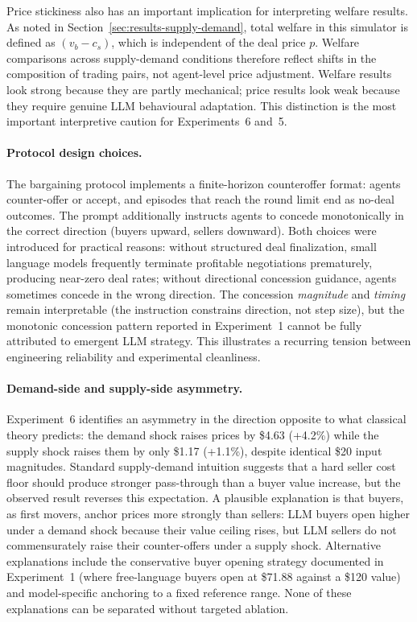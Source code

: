 Price stickiness also has an important implication for interpreting welfare results.  As noted in Section~\ref{sec:results-supply-demand}, total welfare in this simulator is defined as $(v_b - c_s)$, which is independent of the deal price $p$.  Welfare comparisons across supply-demand conditions therefore reflect shifts in the composition of trading pairs, not agent-level price adjustment.  Welfare results look strong because they are partly mechanical; price results look weak because they require genuine LLM behavioural adaptation.  This distinction is the most important interpretive caution for Experiments~6 and~5.

\paragraph{Protocol design choices.}
The bargaining protocol implements a finite-horizon counteroffer format: agents counter-offer or accept, and episodes that reach the round limit end as no-deal outcomes.  The prompt additionally instructs agents to concede monotonically in the correct direction (buyers upward, sellers downward).  Both choices were introduced for practical reasons: without structured deal finalization, small language models frequently terminate profitable negotiations prematurely, producing near-zero deal rates; without directional concession guidance, agents sometimes concede in the wrong direction.  The concession \emph{magnitude} and \emph{timing} remain interpretable (the instruction constrains direction, not step size), but the monotonic concession pattern reported in Experiment~1 cannot be fully attributed to emergent LLM strategy.  This illustrates a recurring tension between engineering reliability and experimental cleanliness.

\paragraph{Demand-side and supply-side asymmetry.}
Experiment~6 identifies an asymmetry in the direction opposite to what classical theory predicts: the demand shock raises prices by \$4.63 (+4.2\%) while the supply shock raises them by only \$1.17 (+1.1\%), despite identical \$20 input magnitudes.  Standard supply-demand intuition suggests that a hard seller cost floor should produce stronger pass-through than a buyer value increase, but the observed result reverses this expectation.  A plausible explanation is that buyers, as first movers, anchor prices more strongly than sellers: LLM buyers open higher under a demand shock because their value ceiling rises, but LLM sellers do not commensurately raise their counter-offers under a supply shock.  Alternative explanations include the conservative buyer opening strategy documented in Experiment~1 (where free-language buyers open at \$71.88 against a \$120 value) and model-specific anchoring to a fixed reference range.  None of these explanations can be separated without targeted ablation.

